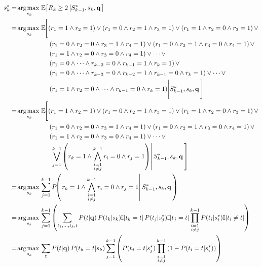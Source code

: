 \begin{align*}
  s_k^* & = \argmax_{s_k} \mathbb{E} \!\left[ R_k \geq 2 \left| S_{k-1}^*, s_k, \vec{q} \right.\right] \\
  & = \argmax_{s_k} \mathbb{E} \!\Bigg[ (r_1=1 \wedge r_2=1) \vee (r_1=0 \wedge r_2=1 \wedge r_3=1) \vee (r_1=1 \wedge r_2=0 \wedge r_3=1) \,\vee \\
  & \hspace{21.7mm} (r_1=0 \wedge r_2=0 \wedge r_3=1 \wedge r_4=1) \vee (r_1=0 \wedge r_2=1 \wedge r_3=0 \wedge r_4=1) \,\vee \\
  & \hspace{21.7mm} (r_1=1 \wedge r_2=0 \wedge r_3=0 \wedge r_4=1) \vee \dots \vee \\
  & \hspace{21.7mm} (r_1=0 \wedge \dots \wedge r_{k-2}=0 \wedge r_{k-1}=1 \wedge r_k=1) \,\vee \\
  & \hspace{21.7mm} (r_1=0 \wedge \dots \wedge r_{k-3}=0 \wedge r_{k-2}=1 \wedge r_{k-1} = 0 \wedge r_k=1) \vee \dots \vee \\
  & \hspace{21.7mm} (r_1=1 \wedge r_2=0 \wedge \dots \wedge r_{k-1}=0 \wedge r_k=1) \Bigg| S_{k-1}^*, s_k, \vec{q} \,\Bigg] \\
  & = \argmax_{s_k} \mathbb{E} \!\Bigg[ (r_1=1 \wedge r_2=1) \vee (r_1=0 \wedge r_2=1 \wedge r_3=1) \vee (r_1=1 \wedge r_2=0 \wedge r_3=1) \,\vee \\
  & \hspace{21.7mm} (r_1=0 \wedge r_2=0 \wedge r_3=1 \wedge r_4=1) \vee (r_1=0 \wedge r_2=1 \wedge r_3=0 \wedge r_4=1) \,\vee \\
  & \hspace{21.7mm} (r_1=1 \wedge r_2=0 \wedge r_3=0 \wedge r_4=1) \vee \dots \vee \\
  & \hspace{21.7mm} \left.\left. \bigvee_{j=1}^{k-1} \left( r_k=1 \wedge \bigwedge_{\substack{i=1 \\ i \neq j}}^{k-1} r_i=0 \wedge r_j=1 \right) \right| S_{k-1}^*, s_k, \vec{q} \,\right] \\
  & = \argmax_{s_k} \sum_{j=1}^{k-1} P \!\!\left(\left. r_k=1 \wedge \bigwedge_{\substack{i=1 \\ i \neq j}}^{k-1} r_i=0 \wedge r_j=1 \right| S_{k-1}^*, s_k, \vec{q} \,\right) \\
  & = \argmax_{s_k} \sum_{j=1}^{k-1} \left( \sum_{t_1, \dots, t_k, t} P(t|\vec{q}) \, P(t_k|s_k) \mathbb{I} [t_k=t] \, P(t_j|s_j^*) \mathbb{I} [t_j=t] \prod_{\substack{i=1 \\ i \neq j}}^{k-1} P(t_i|s_i^*) \mathbb{I} [t_i \neq t] \right) \\
  & = \argmax_{s_k} \sum_t P(t|\vec{q}) \, P(t_k=t|s_k) \sum_{j=1}^{k-1} \left( P(t_j=t|s_j^*) \prod_{\substack{i=1 \\ i \neq j}}^{k-1} \left( 1 - P \! \left( t_i=t|s_i^* \right) \right) \right)
\end{align*}


